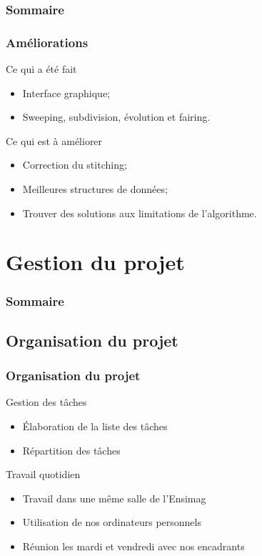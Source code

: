 \documentclass[9pt]{beamer}
\begin{document}
\begin{frame}
	\frametitle{Sommaire}
	\tableofcontents[currentsection]
\end{frame}

\begin{frame}
	\frametitle{Améliorations}
	
	\begin{block}{Ce qui a été fait}
		\begin{itemize}
			\item Interface graphique;
			\item Sweeping, subdivision, évolution et fairing.
		\end{itemize}
	\end{block}
	
	\begin{block}{Ce qui est à améliorer}
		\begin{itemize}
			\item Correction du stitching;
			\item Meilleures structures de données;
			\item Trouver des solutions aux limitations de l'algorithme.
		\end{itemize}
	\end{block}
\end{frame}

\section{Gestion du projet}

\begin{frame}
	\frametitle{Sommaire}
	\tableofcontents[currentsection]
\end{frame}

\subsection{Organisation du projet}

\begin{frame}
	\frametitle{Organisation du projet}
	
	\begin{block} { Gestion des tâches }
		\begin{itemize}
			\item Élaboration de la liste des tâches
			\item Répartition des tâches
		\end{itemize}
	\end{block}
	
	\begin{block}{ Travail quotidien }
		\begin{itemize}
			\item Travail dans une même salle de l'Ensimag
			\item Utilisation de nos ordinateurs personnels
			\item Réunion les mardi et vendredi avec nos encadrants
		\end{itemize}
	\end{block}
\end{frame}
\end{document}
